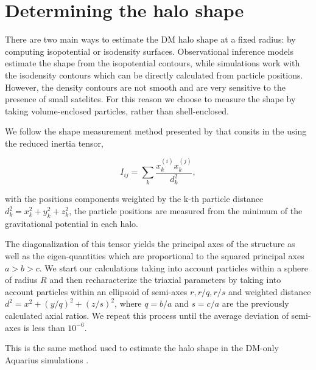 \documentclass[a4paper,fleqn,usenatbib]{mnras}
\begin{document}
\section{Determining the halo shape}


There are two main ways to estimate the DM halo shape at a fixed
radius: by computing isopotential or isodensity surfaces.
Observational inference models estimate the shape from the
isopotential contours, while simulations work with the isodensity
contours which can be  directly calculated from particle positions.  
However, the density contours are not smooth and are very 
sensitive to the presence of small satelites.
For this reason we choose to measure the shape by taking
volume-enclosed particles, rather than shell-enclosed.  

We follow the shape measurement method presented by
\cite{Allgood_et_al._2006} that consits in the using the reduced
inertia tensor,     

\begin{equation}
I_{ij} = \sum_k \frac{x_k^{(i)}x_k^{(j)}}{d^2_k},
\label{eq:inertia}
\end{equation}

with the positions components weighted by the k-th particle distance
$d_k^2=x_k^2+y_k^2+z_k^2$, the particle positions are measured from
the minimum of the gravitational potential in each halo.

The diagonalization of this tensor yields the principal axes of the
structure as well as the eigen-quantities which are proportional to
the squared principal axes $a>b>c$. 
We start our calculations taking
into account particles within a sphere of radius $R$ and then
recharacterize the triaxial parameters by taking into account
particles within an ellipsoid of semi-axes $r,r/q,r/s$ and weighted
distance $d^2=x^2+(y/q)^2+(z/s)^2$, where $q = b/a$ and $s=c/a$
are the previously calculated axial ratios. 
We repeat this process until the average deviation of semi-axes is
less than $10^{-6}$.  

This is the same method used to estimate the halo shape in the DM-only
Aquarius simulations \citep{Vera-Ciro_et_al._2011}. 


 
 
\end{document}
